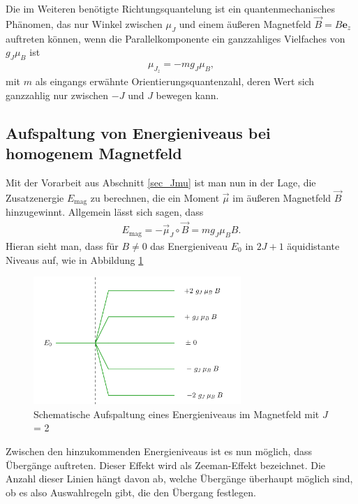 Die im Weiteren benötigte Richtungsquantelung ist ein quantenmechanisches Phänomen, das nur Winkel zwischen $\mu_J$ und einem äußeren Magnetfeld
$\vec B = B \textbf{e}_z$ auftreten können, wenn die Parallelkomponente ein ganzzahliges Vielfaches von $g_J\mu_B$ ist
\begin{align}
 \mu_{J_z} = -m g_J\mu_B,
\end{align}
mit $m$ als eingangs erwähnte Orientierungsquantenzahl, deren Wert sich ganzzahlig nur zwischen $-J$ und $J$ bewegen kann. 
\subsection{Aufspaltung von Energieniveaus bei homogenem Magnetfeld}
Mit der Vorarbeit aus Abschnitt \ref{sec_Jmu} ist man nun in der Lage, die Zusatzenergie $E_{\text{mag}}$ zu berechnen, die ein Moment $\vec \mu$
im äußeren Magnetfeld $\vec B$ hinzugewinnt. Allgemein lässt sich sagen, dass
\begin{align}
 E_{\text{mag}} = -\vec \mu_J \circ \vec B = mg_J\mu_B B.
\end{align}
Hieran sieht man, dass für $B\neq0$ das Energieniveau $E_0$ in $2J+1$ äquidistante Niveaus auf, wie in Abbildung \ref{pic_Eniv}
\begin{figure}[H]
\includegraphics[width=0.7\textwidth]{../pics/Zeeman.png}
\caption{Schematische Aufspaltung eines Energieniveaus im Magnetfeld mit $J$ = 2}
\label{pic_Eniv}
\end{figure}
Zwischen den hinzukommenden Energieniveaus ist es nun möglich, dass Übergänge auftreten. Dieser Effekt wird als Zeeman-Effekt bezeichnet.
Die Anzahl dieser Linien hängt davon ab, welche Übergänge überhaupt möglich sind, ob es also Auswahlregeln gibt, die den Übergang festlegen.

